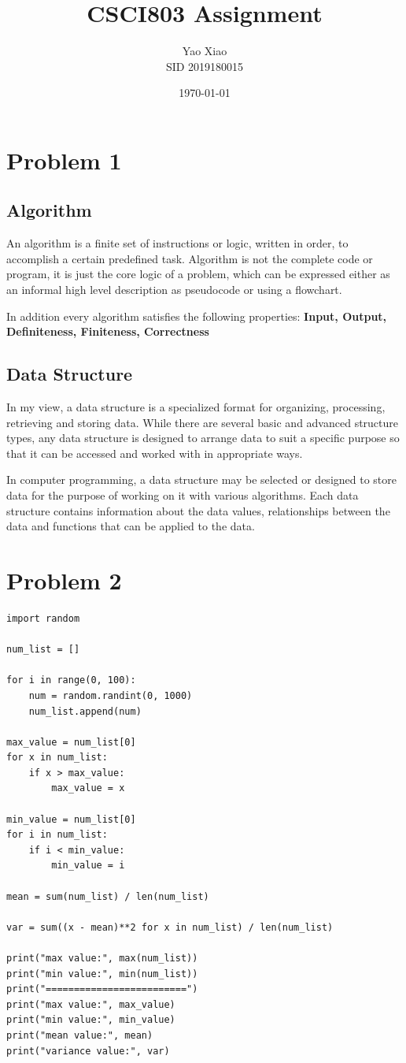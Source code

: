 \documentclass{article}
\title{CSCI803 Assignment}
\author{Yao Xiao \\ SID 2019180015}
\date{\today}
\begin{document}
\maketitle

\section{Problem 1}
\subsection{Algorithm}
An algorithm is a finite set of instructions or logic, written in order, to accomplish a certain predefined task. Algorithm is not the complete code or program, it is just the core logic of a problem, which can be expressed either as an informal high level description as pseudocode or using a flowchart. 

In addition every algorithm satisfies the following properties: \textbf{Input, Output, Definiteness, Finiteness, Correctness}

\subsection{Data Structure}
In my view, a data structure is a specialized format for organizing, processing, retrieving and storing data. While there are several basic and advanced structure types, any data structure is designed to arrange data to suit a specific purpose so that it can be accessed and worked with in appropriate ways.

In computer programming, a data structure may be selected or designed to store data for the purpose of working on it with various algorithms. Each data structure contains information about the data values, relationships between the data and functions that can be applied to the data.



\section{Problem 2}
\begin{lstlisting}
import random

num_list = []

for i in range(0, 100):
    num = random.randint(0, 1000)
    num_list.append(num)

max_value = num_list[0]
for x in num_list:
    if x > max_value:
        max_value = x

min_value = num_list[0]
for i in num_list:
    if i < min_value:
        min_value = i

mean = sum(num_list) / len(num_list)

var = sum((x - mean)**2 for x in num_list) / len(num_list)

print("max value:", max(num_list))
print("min value:", min(num_list))
print("=========================")
print("max value:", max_value)
print("min value:", min_value)
print("mean value:", mean)
print("variance value:", var)
\end{lstlisting}
\end{document}
